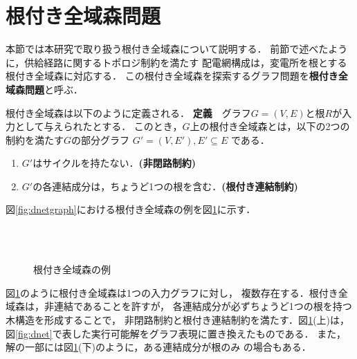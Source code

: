 \section{根付き全域森問題}
本節では本研究で取り扱う根付き全域森について説明する．
前節で述べたように，供給経路に関するトポロジ制約を満たす
配電網構成は，変電所を根とする根付き全域森に対応する．
この根付き全域森を探索するグラフ問題を\textbf{根付き全域森問題}と呼ぶ．

根付き全域森は以下のように定義される．\cite{Minato:dnet:netuki}
\newline
\textbf{定義}~~グラフ$G=(V,E)$と根$R$が入力として与えられたとする．
このとき，$G$上の根付き全域森とは，以下の2つの制約を満たす$G$の部分グラフ
$G'=(V,E'), E' \subseteq E$ である．
\begin{enumerate}
 \item $G'$はサイクルを持たない．\textbf{(非閉路制約)}
 \item $G'$の各連結成分は，ちょうど1つの根を含む．\textbf{(根付き連結制約)}
\end{enumerate}
図\ref{fig:dnetgraph}における根付き全域森の例を図\ref{fig:netuki}に示す．

\begin{figure}[htbp]
  \centering
  \scalebox{0.8}{}
 \mbox{}\\ \mbox{}\\
  \centering
  \scalebox{0.8}{}
 \caption{根付き全域森の例}
 \label{fig:netuki}
\end{figure}

図\ref{fig:netuki}のように根付き全域森は1つの入力グラフに対し，
複数存在する．根付き全域森は，非連結であることを許すが，
各連結成分が必ずちょうど1つの根を持つ木構造を形成することで，
非閉路制約と根付き連結制約を満たす．図\ref{fig:netuki}(上)は，
図\ref{fig:dnet}で表した実行可能解をグラフ表現に置き換えたものである．
また，解の一部には図\ref{fig:netuki}(下)のように，ある連結成分が根のみ
の場合もある．
